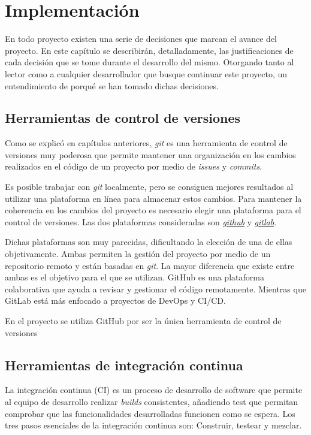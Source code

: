 \chapter{Implementación}
En todo proyecto existen una serie de decisiones que marcan el avance del proyecto. En este capítulo se describirán, detalladamente, las justificaciones de cada decisión que se tome durante el desarrollo del mismo. Otorgando tanto al lector como a cualquier desarrollador que busque continuar este proyecto, un entendimiento de porqué se han tomado dichas decisiones.

\section{Herramientas de control de versiones}
Como se explicó en capítulos anteriores, \emph{\Gls{git}} es una herramienta de control de versiones muy poderosa que permite mantener una organización en los cambios realizados en el código de un proyecto por medio de \emph{\glspl{issue}} y \emph{\glspl{commit}}.

Es posible trabajar con \emph{\Gls{git}} localmente, pero se consiguen mejores resultados al utilizar una plataforma en línea para almacenar estos cambios. Para mantener la coherencia en los cambios del proyecto es necesario elegir una plataforma para el control de versiones. Las dos plataformas consideradas son \href{https://github.com/}{\emph{\Gls{github}}} y \href{https://about.gitlab.com/}{\emph{\Gls{gitlab}}}. 

Dichas plataformas son muy parecidas, dificultando la elección de una de ellas objetivamente. Ambas permiten la gestión del proyecto por medio de un repositorio remoto y están basadas en \emph{\Gls{git}}. La mayor diferencia que existe entre ambas es el objetivo para el que se utilizan. GitHub es una plataforma colaborativa que ayuda a revisar y gestionar el código remotamente. Mientras que GitLab está más enfocado a proyectos de DevOps y CI/CD. \cite{VCS2022}

En el proyecto se utiliza GitHub por ser la única herramienta de control de versiones  

\section{Herramientas de integración continua}
La integración continua (CI) es un proceso de desarrollo de software que permite al equipo de desarrollo realizar \emph{builds} consistentes, añadiendo test que permitan comprobar que las funcionalidades desarrolladas funcionen como se espera. Los tres pasos esenciales de la integración continua son: Construir, testear y mezclar.

